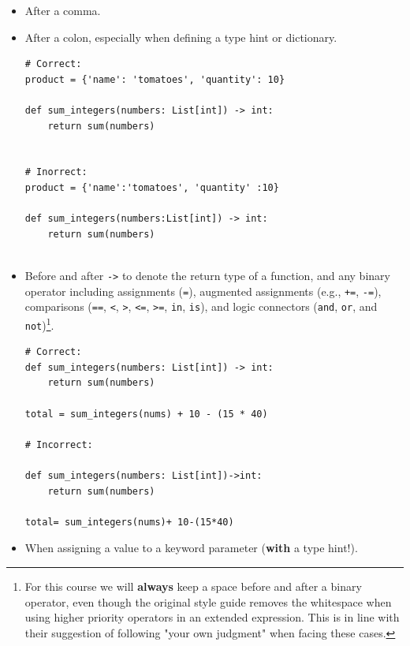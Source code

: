 \documentclass{tufte-handout}
\begin{document}
\begin{itemize}
    \item After a comma.
	\item After a colon, especially when defining a type hint or dictionary.
	
\begin{mdframed}
\begin{verbatim}
# Correct:
product = {'name': 'tomatoes', 'quantity': 10}

def sum_integers(numbers: List[int]) -> int:
	return sum(numbers)
	
	
# Inorrect:
product = {'name':'tomatoes', 'quantity' :10}

def sum_integers(numbers:List[int]) -> int:
    return sum(numbers)
	
\end{verbatim}
\end{mdframed}
	
	\item Before and after \texttt{->} to denote the return type of a function, and any binary operator including assignments (\texttt{=}), augmented assignments (e.g., \texttt{+=}, \texttt{-=}), comparisons (\texttt{==}, \texttt{<}, \texttt{>}, \texttt{<=}, \texttt{>=}, \texttt{in}, \texttt{is}), and logic connectors (\texttt{and}, \texttt{or}, and \texttt{not})\footnote{For this course we will \textbf{always} keep a space before and after a binary operator, even though the original style guide removes the whitespace when using higher priority operators in an extended expression. This is in line with their suggestion of following "your own judgment" when facing these cases.}.

\begin{mdframed}
\begin{verbatim}
# Correct:
def sum_integers(numbers: List[int]) -> int:
    return sum(numbers)

total = sum_integers(nums) + 10 - (15 * 40)

# Incorrect:

def sum_integers(numbers: List[int])->int:
    return sum(numbers)
    
total= sum_integers(nums)+ 10-(15*40)

\end{verbatim}
\end{mdframed}
	
	\item When assigning a value to a keyword parameter (\textbf{with} a type hint!).
	

\end{itemize}
\end{document}
